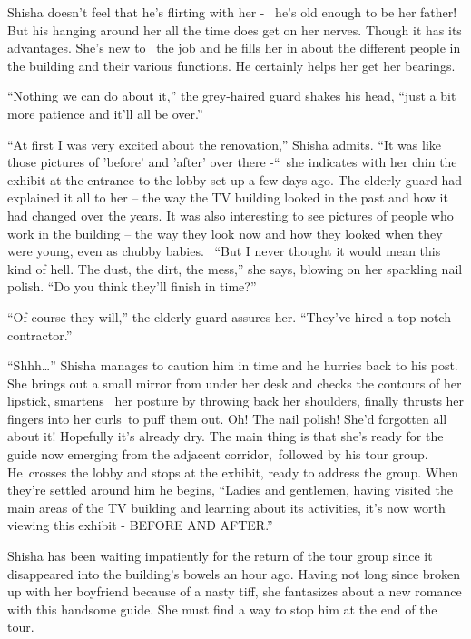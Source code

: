 \documentclass[twoside,11pt]{book}
\begin{document}
Shisha doesn't feel that he's flirting with her - \ he's old enough to be her father! But his hanging around her all the
time does get on her nerves. Though it has its advantages. She's new to{ }\ the job and he fills her in
about the different people in the building and their various functions. He certainly helps her get her bearings.

``Nothing we can do about it,'' the grey-haired guard shakes his head, ``just a
bit more patience and it'll all be over.'' ~

``At first I was very excited about the renovation,'' Shisha admits. ``It was
like those pictures of 'before' and 'after' over there -``~she indicates with her chin the exhibit at the
entrance to the lobby set up a few days ago. The elderly guard had explained it all to her -- the way the TV building
looked in the past and how it had changed over the years. It was also interesting to see pictures of people who work in
the building -- the way they look now and how they looked when they were young, even as chubby babies.
~``But I never thought it would mean this kind of hell. The dust, the dirt, the mess,'' she
says, blowing on her sparkling nail polish. ``Do you think they'll finish in time?''

``Of course they will,'' the elderly guard assures her. ``They've hired a
top-notch contractor.''

``Shhh{\dots}'' Shisha manages to caution him in time and he hurries back to his post. She
brings out a small mirror from under her desk and checks the contours of her lipstick, smartens {\ }her
posture by{ }throwing back her shoulders, finally thrusts her fingers into her curls~to puff them out.
Oh! The nail polish! She'd forgotten all about it! Hopefully it's already dry. The main thing is that she's ready for
the guide now emerging from the adjacent corridor,~followed by his tour group. He~crosses the lobby and stops at the
exhibit, ready to address the group. When they're settled around him he begins, ``Ladies and gentlemen,
having visited the main areas of the TV building and learning about its activities, it's now worth viewing this exhibit
- BEFORE AND AFTER.''

Shisha has been waiting impatiently for the return of the tour group since it disappeared into the building's bowels an
hour ago. Having not long since broken up with her boyfriend because of a nasty tiff, she fantasizes about a new
romance with this handsome guide. She must find a way to stop him at the end of the tour.
\end{document}
